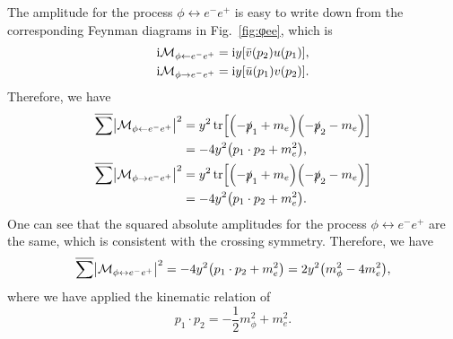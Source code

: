 \documentclass{article}
\begin{document}
        The amplitude for the process $\phi \leftrightarrow e^- e^+$ is easy to write down from the corresponding Feynman diagrams in Fig.~\ref{fig:φee}, which is
        \begin{align}
            \mathrm{i} \mathcal{M}_{\phi \leftarrow e^- e^+} & = \mathrm{i} y \qty[\bar{v}(p_2) u(p_1)], \\
            \mathrm{i} \mathcal{M}_{\phi \to e^- e^+} & = \mathrm{i} y \qty[\bar{u}(p_1) v(p_2)].
        \end{align}
        Therefore, we have \cite{Srednicki:2007qs}
        \begin{align}
            \overline{\sum} \abs{\mathcal{M}_{\phi \leftarrow e^- e^+}}^2 & = y^2 \tr[\qty(-\slashed{p}_1 + m_e) \qty(-\slashed{p}_2 - m_e)] \notag \\
            & = -4 y^2 \qty(p_1 \cdot p_2 + m_e^2), \\
            \overline{\sum} \abs{\mathcal{M}_{\phi \to e^- e^+}}^2 & = y^2 \tr[\qty(-\slashed{p}_1 + m_e) \qty(-\slashed{p}_2 - m_e)] \notag \\
            & = -4 y^2 \qty(p_1 \cdot p_2 + m_e^2).
        \end{align}
        One can see that the squared absolute amplitudes for the process $\phi \leftrightarrow e^- e^+$ are the same, which is consistent with the crossing symmetry.
        Therefore, we have
        \begin{equation}
            \overline{\sum} \abs{\mathcal{M}_{\phi \leftrightarrow e^- e^+}}^2 = -4 y^2 \qty(p_1 \cdot p_2 + m_e^2) = 2 y^2 \qty(m_\phi^2 - 4 m_e^2),
        \end{equation}
        where we have applied the kinematic relation of
        \begin{equation}
            p_1 \cdot p_2 = -\frac{1}{2} m_\phi^2 + m_e^2.
        \end{equation}
\end{document}
